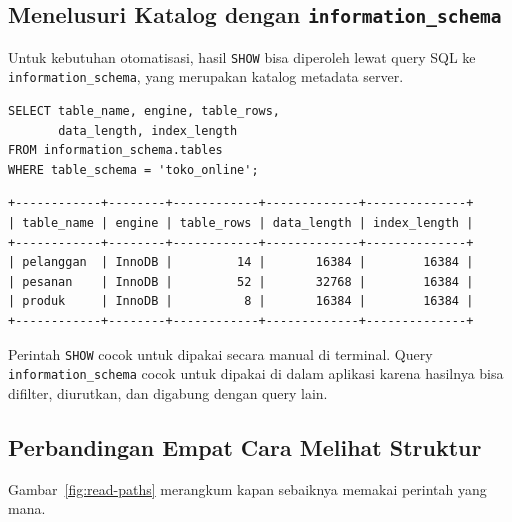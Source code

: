 \documentclass[11pt,a4paper]{article}
\begin{document}
\subsection{Menelusuri Katalog dengan \texttt{information\_schema}}

Untuk kebutuhan otomatisasi, hasil \texttt{SHOW} bisa diperoleh lewat query SQL ke \texttt{information\_schema}, yang merupakan katalog metadata server.

\begin{lstlisting}[style=code]
SELECT table_name, engine, table_rows,
       data_length, index_length
FROM information_schema.tables
WHERE table_schema = 'toko_online';
\end{lstlisting}

\begin{lstlisting}[style=out]
+------------+--------+------------+-------------+--------------+
| table_name | engine | table_rows | data_length | index_length |
+------------+--------+------------+-------------+--------------+
| pelanggan  | InnoDB |         14 |       16384 |        16384 |
| pesanan    | InnoDB |         52 |       32768 |        16384 |
| produk     | InnoDB |          8 |       16384 |        16384 |
+------------+--------+------------+-------------+--------------+
\end{lstlisting}

Perintah \texttt{SHOW} cocok untuk dipakai secara manual di terminal. Query \texttt{information\_schema} cocok untuk dipakai di dalam aplikasi karena hasilnya bisa difilter, diurutkan, dan digabung dengan query lain.

\subsection{Perbandingan Empat Cara Melihat Struktur}

Gambar~\ref{fig:read-paths} merangkum kapan sebaiknya memakai perintah yang mana.
\end{document}
